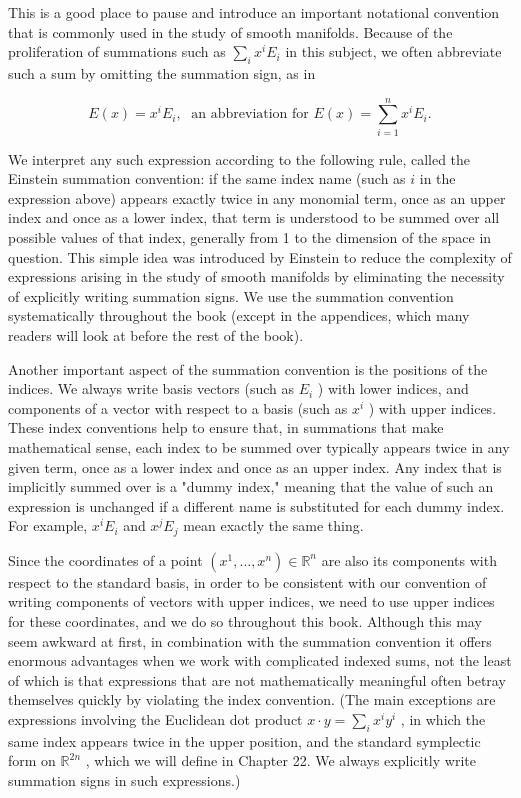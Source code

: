\begin{notation}
\label{not:1-4-extra-1}
\mathlibok
This is a good place to pause and introduce an important notational convention that is commonly used in the study of smooth manifolds. Because of the proliferation of summations such as $\mathop{\sum }\limits_{i}{x}^{i}{E}_{i}$ in this subject, we often abbreviate such a sum by omitting the summation sign, as in

\[
E\left( x\right)  = {x}^{i}{E}_{i},\;\text{ an abbreviation for }E\left( x\right)  = \mathop{\sum }\limits_{{i = 1}}^{n}{x}^{i}{E}_{i}.
\]

We interpret any such expression according to the following rule, called the Einstein summation convention: if the same index name (such as $i$ in the expression above) appears exactly twice in any monomial term, once as an upper index and once as a lower index, that term is understood to be summed over all possible values of that index, generally from 1 to the dimension of the space in question. This simple idea was introduced by Einstein to reduce the complexity of expressions arising in the study of smooth manifolds by eliminating the necessity of explicitly writing summation signs. We use the summation convention systematically throughout the book (except in the appendices, which many readers will look at before the rest of the book).

Another important aspect of the summation convention is the positions of the indices. We always write basis vectors (such as ${E}_{i}$ ) with lower indices, and components of a vector with respect to a basis (such as ${x}^{i}$ ) with upper indices. These index conventions help to ensure that, in summations that make mathematical sense, each index to be summed over typically appears twice in any given term, once as a lower index and once as an upper index. Any index that is implicitly summed over is a "dummy index," meaning that the value of such an expression is unchanged if a different name is substituted for each dummy index. For example, ${x}^{i}{E}_{i}$ and ${x}^{j}{E}_{j}$ mean exactly the same thing.

Since the coordinates of a point $\left( {{x}^{1},\ldots ,{x}^{n}}\right)  \in  {\mathbb{R}}^{n}$ are also its components with respect to the standard basis, in order to be consistent with our convention of writing components of vectors with upper indices, we need to use upper indices for these coordinates, and we do so throughout this book. Although this may seem awkward at first, in combination with the summation convention it offers enormous advantages when we work with complicated indexed sums, not the least of which is that expressions that are not mathematically meaningful often betray themselves quickly by violating the index convention. (The main exceptions are expressions involving the Euclidean dot product $x \cdot  y = \mathop{\sum }\limits_{i}{x}^{i}{y}^{i}$ , in which the same index appears twice in the upper position, and the standard symplectic form on ${\mathbb{R}}^{2n}$ , which we will define in Chapter 22. We always explicitly write summation signs in such expressions.)
\end{notation}

